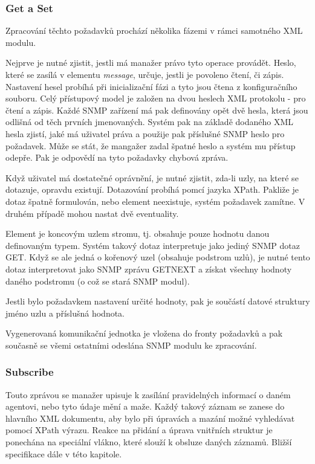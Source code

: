 \subsubsection*{Get a Set}
Zpracování těchto požadavků prochází několika fázemi v rámci samotného XML modulu.

Nejprve je nutné zjistit, jestli má manažer právo tyto operace provádět. Heslo, které se zasílá v elementu \textit{message}, určuje, jestli je
povoleno čtení, či zápis. Nastavení hesel probíhá při inicializační fázi a tyto jsou čtena z konfiguračního souboru. Celý přístupový model je
založen na dvou heslech XML protokolu - pro čtení a zápis. Každé SNMP zařízení má pak definovány opět dvě hesla, která jsou odlišná od těch prvních jmenovaných.
Systém pak na základě dodaného XML hesla zjistí, jaké má uživatel práva a použije pak příslušné SNMP heslo pro požadavek. Může se stát, že mangažer zadal
špatné heslo a systém mu přístup odepře. Pak je odpovědí na tyto požadavky chybová zpráva.

Když uživatel má dostatečné oprávnění, je nutné zjistit, zda-li uzly, na které se dotazuje, opravdu existují. Dotazování probíhá pomcí jazyka XPath.
Pakliže je dotaz špatně formulován, nebo element neexistuje, systém požadavek zamítne. V druhém případě mohou nastat dvě eventuality.

Element je koncovým uzlem stromu, tj. obsahuje pouze hodnotu danou definovaným typem. Systém takový dotaz interpretuje jako jediný SNMP dotaz GET.
Když se ale jedná o kořenový uzel (obsahuje podstrom uzlů), je nutné tento dotaz interpretovat jako
SNMP zprávu GETNEXT a získat všechny hodnoty daného podstromu (o což se stará SNMP modul).

Jestli bylo požadavkem nastavení určité hodnoty, pak je součástí datové struktury jméno uzlu a příslušná hodnota.

Vygenerovaná komunikační jednotka je vložena do fronty požadavků a pak současně se všemi ostatními odeslána SNMP modulu ke zpracování.

\subsubsection*{Subscribe}
Touto zprávou se manažer upisuje k zasílání pravidelných informací o daném agentovi, nebo tyto údaje mění a maže. Každý takový záznam
se zanese do hlavního XML dokumentu, aby bylo při úpravách a mazání možné vyhledávat pomocí XPath výrazu. Reakce na přidání a úprava
vnitřních struktur je ponechána na speciální vlákno, které slouží k obsluze daných záznamů. Bližší specifikace dále v této kapitole.

